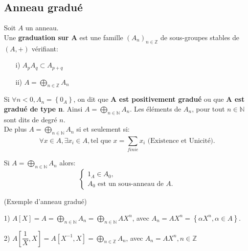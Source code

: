 \subsection{Anneau gradué}
\begin{madefinition}
	Soit $A$ un anneau.\\
	Une \textbf{graduation sur A} est une famille $(A_n)_{n \in \mathbb{Z}}$ de  sous-groupes stables de $(A,+)$ vérifiant:
	\begin{enumerate}
		\item[i)] $ A_p A_q \subset A_{p+q} $
		\item[ii)] $ A =\displaystyle \bigoplus_{n \in \mathbb{Z}}{A_n} $
	\end{enumerate}
	Si $\forall n < 0, A_n = \left\{0_A\right\}$, on dit que \textbf{A est positivement gradué} ou que \textbf{A est gradué de type n}. Ainsi $ A =\displaystyle \bigoplus_{n \in \mathbb{N}}{A_n} $. Les éléments de $A_n$, pour tout $n \in \mathbb{N} $ sont dits de degré $n$.\\
	De plus $ A =\displaystyle \bigoplus_{n \in \mathbb{N}}{A_n} $ si et seulement si:
	\[ \forall x \in A, \exists x_i \in A, \text{tel que } x = \sum_{finie}^{} x_i \text{ (Existence et Unicité)}. \]
\end{madefinition} 
\begin{maremarque}
	Si $ A =\displaystyle \bigoplus_{n \in \mathbb{N}}{A_n} $ alors:
	$$  
	\begin{cases}
		1_A \in A_0,\\
		A_0 \text{ est un sous-anneau de }A. 
	\end{cases}
	$$
	\newline
	\begin{monexemple}
		(Exemple d'anneau gradué)\\
		\item[1)] $A[X] =  A =\displaystyle \bigoplus_{n \in \mathbb{N}}{A_n} =\displaystyle \bigoplus_{n \in \mathbb{N}}{A}X^n $,
		avec $A_n=AX^n = \left\{\alpha X^n, \alpha \in A \right\}$.
		\item[2)] $A[\dfrac{1}{X}, X] = A[X^{-1}, X] = \displaystyle \bigoplus_{n \in \mathbb{Z}}{A_n}$, avec $A_n=AX^n, n \in \mathbb{Z}$
	\end{monexemple}
\end{maremarque}

